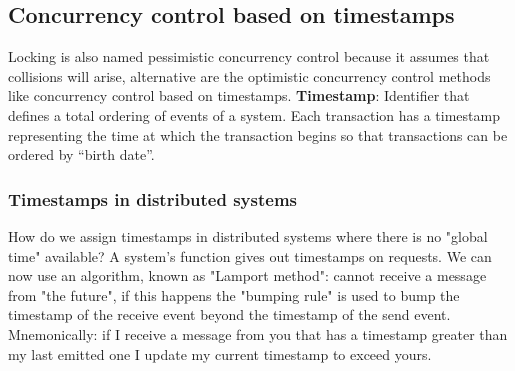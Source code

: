 \subsection{Concurrency control based on timestamps}
Locking is also named pessimistic concurrency control because it assumes that collisions will arise, alternative are the optimistic concurrency control methods like concurrency control based on timestamps.\newline
\newline
\textbf{Timestamp}: Identifier that defines a total ordering of events of a system.\newline
\newline
Each transaction has a timestamp representing the time
at which the transaction begins so that transactions can
be ordered by “birth date”.
\subsubsection{Timestamps in distributed systems}
How do we assign timestamps in distributed systems where there is no "global time" available? A system’s function gives out timestamps on requests.\newline
We can now use an algorithm, known as "Lamport method": cannot receive a message from "the
future", if this happens the "bumping rule" is used to bump the
timestamp of the receive event beyond the timestamp of the send
event.\newline
\newline
Mnemonically: if I receive a message from you that has a
timestamp greater than my last emitted one I update my current
timestamp to exceed yours.
